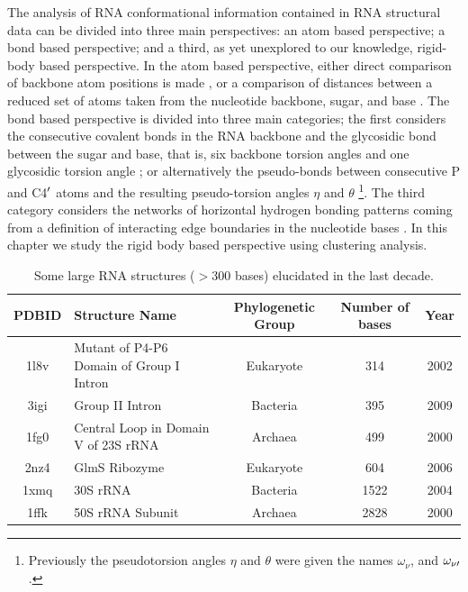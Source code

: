\noindent The analysis of  RNA conformational information contained in
RNA structural  data can be  divided into three main  perspectives: an
atom based perspective; a bond  based perspective; and a third, as yet
unexplored  to our  knowledge, rigid-body  based perspective.   In the
atom  based perspective,  either  direct comparison  of backbone  atom
positions is  made \cite{reijmers2001},  or a comparison  of distances
between a  reduced set  of atoms taken  from the  nucleotide backbone,
sugar,  and  base \cite{sykes2005}.   The  bond  based perspective  is
divided  into   three  main   categories;  the  first   considers  the
consecutive covalent bonds in the RNA backbone and the glycosidic bond
between the sugar  and base, that is, six  backbone torsion angles and
one   glycosidic   torsion   angle   \cite{reijmers2001,   murray2003,
  hershkovitz2003,  schneider2004, hershkovitz2006};  or alternatively
the  pseudo-bonds between consecutive  P and  C4$^{\rm{\prime}}$ atoms
and   the  resulting   pseudo-torsion  angles   $\eta$   and  $\theta$
\cite{olson1_1972,               duarte1998,               duarte2003,
  wadley2007} \footnote{Previously the pseudotorsion angles $\eta$ and
  $\theta$    were    given     the    names    $\omega_{\nu}$,    and
  $\omega_{\nu\rm{\prime}}$.\cite{malathi1985}}.   The  third category
considers the networks of  horizontal hydrogen bonding patterns coming
from  a definition of  interacting edge  boundaries in  the nucleotide
bases \cite{westhof2000, leontis2002, leontis2006}. In this chapter we
study the rigid body based perspective using clustering analysis.
\begin{table}[htbp]
\begin{center}
{\small
\begin{tabular}{c|p{5cm}|c|c|c}
\hline
\bf{PDBID} & \bf{Structure Name} & \bf{Phylogenetic Group} & \bf{Number of bases} & \bf{Year} \\ \hline
1l8v & Mutant of P4-P6 Domain of Group I Intron & Eukaryote & 314 & 2002 \\ \hline
3igi & Group II Intron & Bacteria & 395 & 2009 \\ \hline
1fg0 & Central Loop in Domain V of 23S rRNA & Archaea & 499 & 2000 \\ \hline
2nz4 & GlmS Ribozyme & Eukaryote & 604 & 2006 \\ \hline
1xmq & 30S rRNA & Bacteria & 1522 & 2004 \\ \hline
1ffk & 50S rRNA Subunit & Archaea & 2828 & 2000 \\ \hline
\end{tabular}
}
\caption{Some large RNA structures ($>$300 bases) elucidated in the last decade.}
\end{center}
\label{tab:rnarange}
\end{table}

